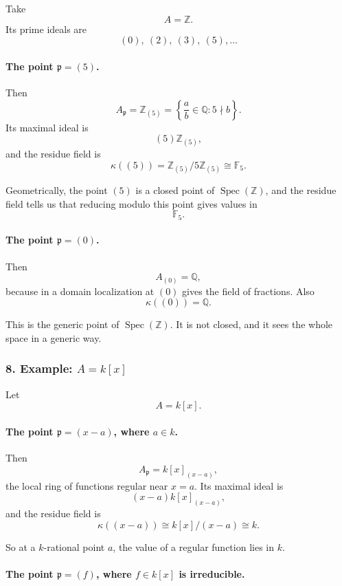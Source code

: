 \documentclass[12pt,a4paper]{article}
\theoremstyle{notespace}
\newcommand{\Spec}{\operatorname{Spec}}
\theoremstyle{definition}
\begin{document}
Take
\[
A=\mathbb Z.
\]
Its prime ideals are
\[
(0),\ (2),\ (3),\ (5),\dots
\]

\paragraph{The point \(\mathfrak p=(5)\).}

Then
\[
A_{\mathfrak p}=\mathbb Z_{(5)}
=
\left\{
\frac{a}{b}\in \mathbb Q:5\nmid b
\right\}.
\]
Its maximal ideal is
\[
(5)\mathbb Z_{(5)},
\]
and the residue field is
\[
\kappa((5))
=
\mathbb Z_{(5)}/5\mathbb Z_{(5)}
\cong
\mathbb F_5.
\]

Geometrically, the point \((5)\) is a closed point of \(\Spec(\mathbb Z)\), and the residue field tells us that reducing modulo this point gives values in
\[
\mathbb F_5.
\]

\paragraph{The point \(\mathfrak p=(0)\).}

Then
\[
A_{(0)}=\mathbb Q,
\]
because in a domain localization at \((0)\) gives the field of fractions. Also
\[
\kappa((0))=\mathbb Q.
\]

This is the generic point of \(\Spec(\mathbb Z)\). It is not closed, and it sees the whole space in a generic way.

\subsubsection{8. Example: \(A=k[x]\)}

Let
\[
A=k[x].
\]

\paragraph{The point \(\mathfrak p=(x-a)\), where \(a\in k\).}

Then
\[
A_{\mathfrak p}=k[x]_{(x-a)},
\]
the local ring of functions regular near \(x=a\). Its maximal ideal is
\[
(x-a)k[x]_{(x-a)},
\]
and the residue field is
\[
\kappa((x-a))
\cong
k[x]/(x-a)
\cong
k.
\]

So at a \(k\)-rational point \(a\), the value of a regular function lies in \(k\).

\paragraph{The point \(\mathfrak p=(f)\), where \(f\in k[x]\) is irreducible.}
\end{document}
